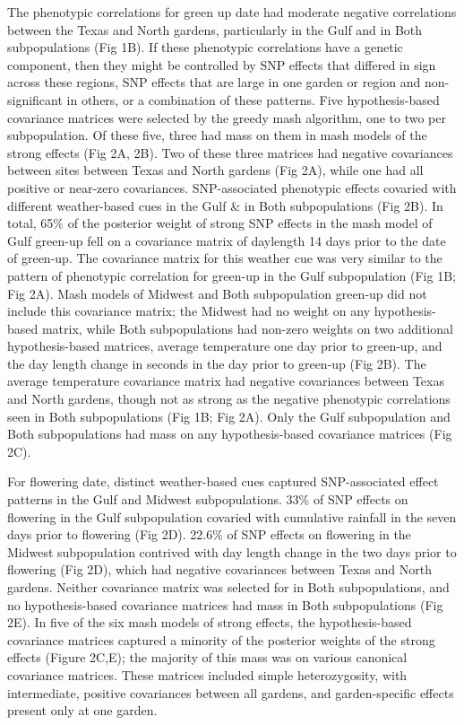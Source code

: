 \documentclass[
  9pt,
  twocolumn,
  twoside]{pnas-new}
\begin{document}
The phenotypic correlations for green up date had moderate negative
correlations between the Texas and North gardens, particularly in the
Gulf and in Both subpopulations (Fig 1B). If these phenotypic
correlations have a genetic component, then they might be controlled by
SNP effects that differed in sign across these regions, SNP effects that
are large in one garden or region and non-significant in others, or a
combination of these patterns. Five hypothesis-based covariance matrices
were selected by the greedy mash algorithm, one to two per
subpopulation. Of these five, three had mass on them in mash models of
the strong effects (Fig 2A, 2B). Two of these three matrices had
negative covariances between sites between Texas and North gardens (Fig
2A), while one had all positive or near-zero covariances. SNP-associated
phenotypic effects covaried with different weather-based cues in the
Gulf \& in Both subpopulations (Fig 2B). In total, 65\% of the posterior
weight of strong SNP effects in the mash model of Gulf green-up fell on
a covariance matrix of daylength 14 days prior to the date of green-up.
The covariance matrix for this weather cue was very similar to the
pattern of phenotypic correlation for green-up in the Gulf subpopulation
(Fig 1B; Fig 2A). Mash models of Midwest and Both subpopulation green-up
did not include this covariance matrix; the Midwest had no weight on any
hypothesis-based matrix, while Both subpopulations had non-zero weights
on two additional hypothesis-based matrices, average temperature one day
prior to green-up, and the day length change in seconds in the day prior
to green-up (Fig 2B). The average temperature covariance matrix had
negative covariances between Texas and North gardens, though not as
strong as the negative phenotypic correlations seen in Both
subpopulations (Fig 1B; Fig 2A). Only the Gulf subpopulation and Both
subpopulations had mass on any hypothesis-based covariance matrices (Fig
2C).

For flowering date, distinct weather-based cues captured SNP-associated
effect patterns in the Gulf and Midwest subpopulations. 33\% of SNP
effects on flowering in the Gulf subpopulation covaried with cumulative
rainfall in the seven days prior to flowering (Fig 2D). 22.6\% of SNP
effects on flowering in the Midwest subpopulation contrived with day
length change in the two days prior to flowering (Fig 2D), which had
negative covariances between Texas and North gardens. Neither covariance
matrix was selected for in Both subpopulations, and no hypothesis-based
covariance matrices had mass in Both subpopulations (Fig 2E). In five of
the six mash models of strong effects, the hypothesis-based covariance
matrices captured a minority of the posterior weights of the strong
effects (Figure 2C,E); the majority of this mass was on various
canonical covariance matrices. These matrices included simple
heterozygosity, with intermediate, positive covariances between all
gardens, and garden-specific effects present only at one garden.
\end{document}
